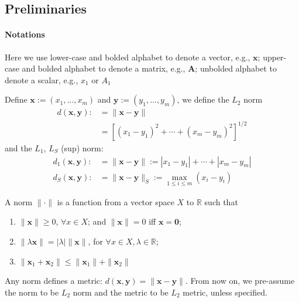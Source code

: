 \subsection{Preliminaries}
\paragraph{Notations}Here we use lower-case and bolded alphabet to denote a vector, e.g., $\bm x$; upper-case and bolded alphabet to denote a matrix, e.g., $\bm A$; unbolded alphabet to denote a scalar, e.g., $x_1$ or $A_1$

Define $\bm x:=(x_1,\dots,x_m)$ and $\bm y:=(y_1,\dots,y_m)$, we define the $L_2$ norm
\begin{align*}
d(\bm x,\bm y):&=\|\bm x-\bm y\|\\
&=\left[(x_1-y_1)^2+\cdots+(x_m-y_m)^2\right]^{1/2}
\end{align*}
and the $L_1$, $L_{S}$ (sup) norm:
\begin{align*}
d_1(\bm x,\bm y):&=\|\bm x-\bm y\|:=|x_1-y_1|+\cdots+|x_m-y_m|\\
d_S(\bm x,\bm y):&=\|\bm x-\bm y\|_S:=\max_{1\le i\le m}(x_i-y_i)
\end{align*}
\begin{definition}
A norm $\|\cdot\|$ is a function from a vector space $X$ to $\mathbb{R}$ such that
\begin{enumerate}
\item
$\|\bm x\|\ge0$, $\forall x\in X$; and $\|\bm x\|=0$ iff $\bm x=\bm0$;
\item
$\|\lambda\bm x\| = |\lambda|\|\bm x\|$, for $\forall x\in X,\lambda\in\mathbb{R}$;
\item
$\|\bm x_1+\bm x_2\|\le \|\bm x_1\| + \|\bm x_2\|$
\end{enumerate}
\end{definition}
\begin{remark}
Any norm defines a metric: $d(\bm x,\bm y)=\|\bm x-\bm y\|$. From now on, we pre-assume the norm to be $L_2$ norm and the metric to be $L_2$ metric, unless specified.
\end{remark}

